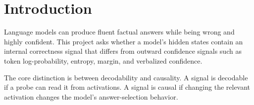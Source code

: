 \section{Introduction}

Language models can produce fluent factual answers while being wrong and highly
confident. This project asks whether a model's hidden states contain an internal
correctness signal that differs from outward confidence signals such as token
log-probability, entropy, margin, and verbalized confidence.

The core distinction is between decodability and causality. A signal is
decodable if a probe can read it from activations. A signal is causal if changing
the relevant activation changes the model's answer-selection behavior.

